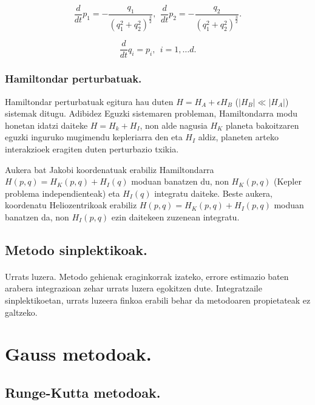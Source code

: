 \begin{equation}
\frac{d}{dt}{p}_1= -\frac{q_1}{(q_1^2+q_2^2)^{\frac{3}{2}}}, \ \, \frac{d}{dt}{p}_2= -\frac{q_2}{(q_1^2+q_2^2)^{\frac{3}{2}}}.
\end{equation}
  
\begin{equation}
\frac{d}{dt}{q}_i=p_i, \ \ i=1, \dots d.
\end{equation}



\subsubsection*{Hamiltondar perturbatuak.}

Hamiltondar perturbatuak egitura hau duten $H=H_A+\epsilon H_B$ ($|H_B|\ll |H_A|$)  sistemak ditugu. Adibidez Eguzki sistemaren probleman, Hamiltondarra modu honetan idatzi daiteke $H=H_k+H_I$, non alde nagusia $H_K$ planeta bakoitzaren eguzki inguruko mugimendu kepleriarra den eta $H_I$ aldiz, planeten arteko interakzioek eragiten duten perturbazio txikia.   

Aukera bat Jakobi koordenatuak erabiliz Hamiltondarra $H(p,q)=H_K(p,q)+H_I(q)$ moduan banatzen du, non $H_K(p,q)$ (Kepler problema independienteak) eta $H_I(q)$ integratu daiteke. Beste aukera, koordenatu Heliozentrikoak erabiliz
$H(p,q)=H_K(p,q)+H_I(p,q)$ moduan banatzen da, non $H_I(p,q)$ ezin daitekeen zuzenean integratu.

\subsection{Metodo sinplektikoak.}

\paragraph*{} Urrats luzera. Metodo gehienak eraginkorrak izateko, errore estimazio baten arabera integrazioan zehar urrats luzera egokitzen dute. Integratzaile sinplektikoetan, urrats luzeera finkoa erabili behar da metodoaren propietateak ez galtzeko.  

\section{Gauss metodoak.}


\subsection{Runge-Kutta metodoak.}

